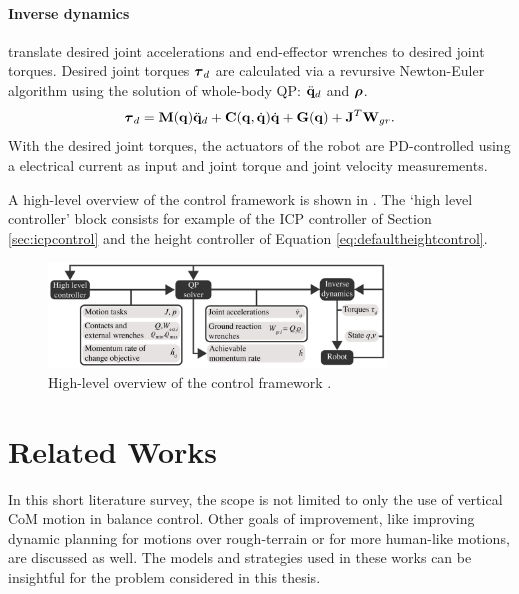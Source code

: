 \paragraph{Inverse dynamics} translate desired joint accelerations and end-effector wrenches to desired joint torques. Desired joint torques $\boldsymbol{\tau}_d$ are calculated via a revursive Newton-Euler algorithm using the solution of whole-body \ac{QP}: $\ddot{\mathbf{q}}_d$ and $\boldsymbol{\rho}$.
\begin{equation}
    \boldsymbol{\tau}_d = \mathbf{M}(\mathbf{q})\ddot{\mathbf{q}}_d + \mathbf{C}(\mathbf{q},\dot{\mathbf{q}})\dot{\mathbf{q}} + \mathbf{G}(\mathbf{q}) + \mathbf{J}^T \mathbf{W}_{gr}.
\end{equation}
With the desired joint torques, the actuators of the robot are PD-controlled using a electrical current as input and joint torque and joint velocity measurements.

A high-level overview of the control framework is shown in . The `high level controller' block consists for example of the \ac{ICP} controller of Section \ref{sec:icpcontrol} and the height controller of Equation \ref{eq:defaultheightcontrol}.
\begin{figure}[h]
\centering
\includegraphics[width=0.8\textwidth]{STYLESTUFF/controlframework.png}
\caption{High-level overview of the control framework \cite{koolen2016design}. }
\label{fig:framework}
\end{figure}

\section{Related Works}\label{sec:relatedworksheight}
In this short literature survey, the scope is not limited to only the use of vertical \ac{CoM} motion in balance control. Other goals of improvement, like improving dynamic planning for motions over rough-terrain or for more human-like motions, are discussed as well. The models and strategies used in these works can be insightful for the problem considered in this thesis.

